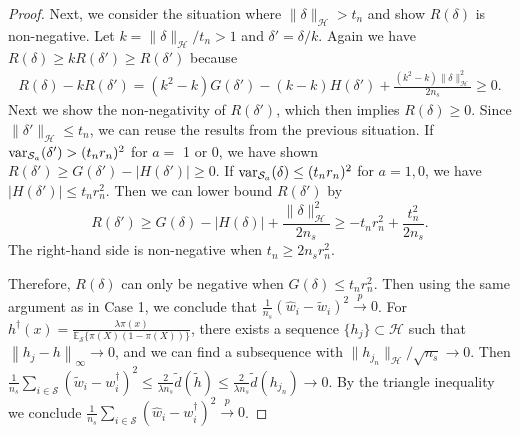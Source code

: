 \documentclass[12pt]{article}
\newcommand{\E}{\mathbb{E}}
\newcommand{\var}{\textnormal{var}}
\begin{document}
\begin{proof}
	Next, we consider the situation where $\| \delta \|_\mathcal{H} > t_n$ and show $R(\delta)$ is non-negative. Let $k = \| \delta \|_\mathcal{H} / t_n > 1$ and $\delta' = \delta / k$. Again we have $R(\delta) \ge k R(\delta') \ge R(\delta')$ because
	\begin{align*}
		R(\delta) - k R(\delta')
		= (k^2 - k) G(\delta') - (k - k) H(\delta') + \frac{(k^2 - k) \| \delta \|_\mathcal{H}^2}{2 n_s}
		\ge 0
		.\end{align*}
	Next we show the non-negativity of $R(\delta')$, which then implies $R(\delta) \ge 0$. Since $\| \delta' \|_\mathcal{H} \le t_n$, we can reuse the results from the previous situation. 
	If $\var_{\mathcal{S}_a}(\delta') > (t_n r_n)^2$ for $a=$ 1 or 0, we have shown $R(\delta') \ge G(\delta') - |H(\delta')| \ge 0$. 
	If $\var_{\mathcal{S}_a}(\delta) \le (t_n r_n)^2$ for $a = 1, 0$, we have $|H(\delta')| \le t_n r_n^2$. Then we can lower bound $R(\delta')$ by
	\begin{equation*}
		R(\delta') \ge 
		G(\delta) - |H(\delta)| + 
		\frac{\| \delta \|_\mathcal{H}^2 }{2 n_s} \ge
		- t_n r_n^2 + 
		\frac{t_n^2 }{2 n_s}
		.\end{equation*}
	The right-hand side is non-negative when $t_n \ge 2 n_s r_n^2$. 
	
	Therefore, $R(\delta)$ can only be negative when $G(\delta) \le t_n r_n^2$. Then using the same argument as in Case 1, we conclude that $\frac{1}{n_s} (\hat{w}_i - \tilde{w}_i)^2 \overset{p}{\longrightarrow} 0$. For $h^\dagger(x) = \frac{\lambda \pi(x)}{\E_{\mathcal{S}}\{\pi(X)(1-\pi(X))\}}$, there exists a sequence $\{h_j\} \subset \mathcal{H}$ such that $\left\| h_j - h \right\|_\infty \rightarrow 0$, and we can find a subsequence with $\| h_{j_n} \|_\mathcal{H}/\sqrt{n_s} \rightarrow 0$. Then $\frac{1}{n_s} \sum_{i \in \mathcal{S}} (\tilde{w}_i - w^\dagger_i)^2 \le \frac{2}{\lambda n_s} \tilde{d}(\tilde{h}) \le \frac{2}{\lambda n_s} \tilde{d}(h_{j_n}) \rightarrow 0$. By the triangle inequality we conclude $\frac{1}{n_s} \sum_{i \in \mathcal{S}} (\hat{w}_i - w^\dagger_i)^2 \overset{p}{\longrightarrow} 0 $.
	
\end{proof}



\vspace{1in}
\end{document}
